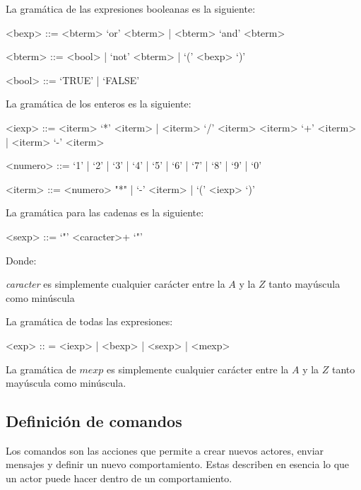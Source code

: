 La gramática de las expresiones booleanas es la siguiente:

\begin{grammar}

<bexp> ::= <bterm> `or' <bterm> | <bterm> `and' <bterm> 
  
<bterm> ::= <bool> | `not' <bterm> | `(' <bexp> `)' 

<bool> ::= `TRUE' | `FALSE'

\end{grammar}

La gramática de los enteros es la siguiente:

\begin{grammar}

<iexp> ::= <iterm> `*' <iterm> | <iterm> `/' <iterm>  
  \alt <iterm> `+' <iterm>  | <iterm> `-' <iterm>

<numero> ::= `1' | `2' | `3' | `4' | `5' | `6' | `7' | `8' | `9' | `0'

<iterm> ::= <numero> "*" | `-' <iterm> | `(' <iexp> `)'

\end{grammar}

La gramática para las cadenas es la siguiente:

\begin{grammar}
 <sexp> ::= `"' <caracter>+ `"'
\end{grammar}

Donde:

\begin{description}
 \item \textit{caracter} es simplemente cualquier carácter entre la $A$ y la $Z$ tanto mayúscula como minúscula
\end{description}

La gramática de todas las expresiones:

\begin{grammar}
<exp> :: = <iexp> | <bexp> | <sexp> | <mexp>  
\end{grammar}

La gramática de $mexp$ es simplemente cualquier carácter entre la $A$ y la $Z$ tanto mayúscula como minúscula. 

\subsection{Definición de comandos}

Los comandos son las acciones que permite a \SAL crear nuevos actores, enviar mensajes y definir un nuevo comportamiento. Estas describen en esencia lo que un actor puede hacer dentro de un comportamiento.

